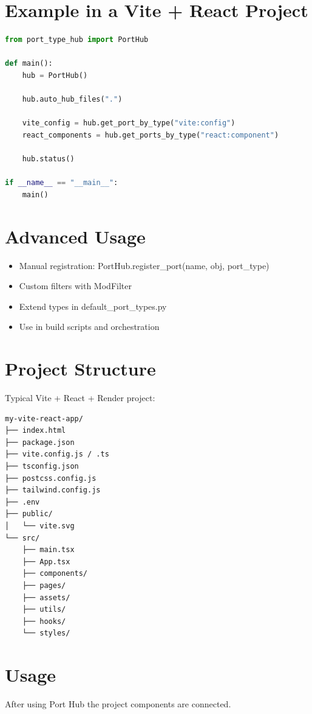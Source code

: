 \documentclass[11pt,a4paper]{article}
\begin{document}
\section{Example in a Vite + React Project}

\begin{lstlisting}[language=Python]
from port_type_hub import PortHub

def main():
    hub = PortHub()
   
    hub.auto_hub_files(".")
   
    vite_config = hub.get_port_by_type("vite:config")
    react_components = hub.get_ports_by_type("react:component")
   
    hub.status()
   
if __name__ == "__main__":
    main()
\end{lstlisting}

\section{Advanced Usage}

\begin{itemize}
    \item Manual registration: PortHub.register\_port(name, obj, port\_type)
    \item Custom filters with ModFilter
    \item Extend types in default\_port\_types.py
    \item Use in build scripts and orchestration
\end{itemize}

\section{Project Structure}

Typical Vite + React + Render project:

\begin{verbatim}
my-vite-react-app/
├── index.html
├── package.json
├── vite.config.js / .ts
├── tsconfig.json
├── postcss.config.js
├── tailwind.config.js
├── .env
├── public/
│   └── vite.svg
└── src/
    ├── main.tsx
    ├── App.tsx
    ├── components/
    ├── pages/
    ├── assets/
    ├── utils/
    ├── hooks/
    └── styles/
\end{verbatim}

\section{Usage}

After using Port Hub the project components are connected.
\end{document}
